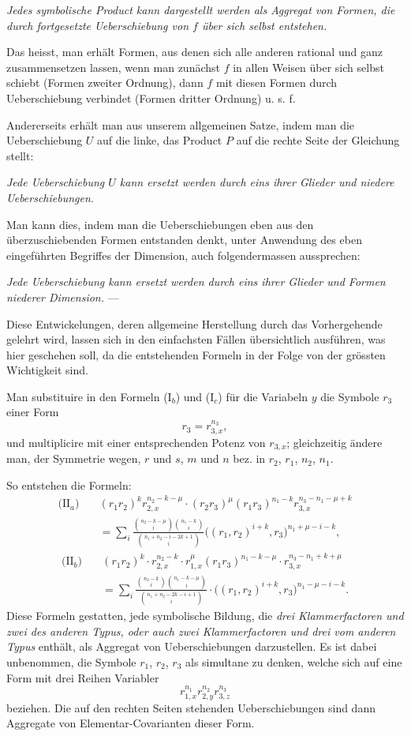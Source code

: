 \documentclass[10pt]{article}
\begin{document}
\emph{Jedes symbolische Product kann dargestellt werden als Aggregat von Formen, die durch fortgesetzte Ueberschiebung von $f$ über sich selbst entstehen.}

Das heisst, man erhält Formen, aus denen sich alle anderen rational und ganz zusammensetzen lassen, wenn man zunächst $f$ in allen Weisen über sich selbst schiebt (Formen zweiter Ordnung), dann $f$ mit diesen Formen durch Ueberschiebung verbindet (Formen dritter Ordnung) u. s. f.

Andererseits erhält man aus unserem allgemeinen Satze, indem man die Ueberschiebung $U$ auf die linke, das Product $P$ auf die rechte Seite der Gleichung stellt:

\emph{Jede Ueberschiebung $U$ kann ersetzt werden durch eins ihrer Glieder und niedere Ueberschiebungen.}

Man kann dies, indem man die Ueberschiebungen eben aus den überzuschiebenden Formen entstanden denkt, unter Anwendung des eben eingeführten Begriffes der Dimension, auch folgendermassen aussprechen:

\emph{Jede Ueberschiebung kann ersetzt werden durch eins ihrer Glieder und Formen niederer Dimension.} ---

Diese Entwickelungen, deren allgemeine Herstellung durch das Vorhergehende gelehrt wird, lassen sich in den einfachsten Fällen übersichtlich ausführen, was hier geschehen soll, da die entstehenden Formeln in der Folge von der grössten Wichtigkeit sind.

Man substituire in den Formeln (I$_b$) und (I$_c$) für die Variabeln $y$ die Symbole $r_3$ einer Form
\[
r_3=r_{3,x}^{n_3},
\]
und multiplicire mit einer entsprechenden Potenz von $r_{3,x}$; gleichzeitig ändere man, der Symmetrie wegen, $r$ und $s$, $m$ und $n$ bez. in $r_2$, $r_1$, $n_2$, $n_1$.

So entstehen die Formeln:
\[
\begin{aligned}
\text{(II$_a$)}\quad &(r_1r_2)^k r_{2,x}^{n_2-k-\mu}\cdot(r_2r_3)^\mu(r_1r_3)^{n_1-k}r_{3,x}^{n_3-n_1-\mu+k}\\
&=\sum_i\frac{\binom{n_2-k-\mu}{i}\binom{n_1-k}{i}}{\binom{n_1+n_2-i-2k+1}{i}}\bigl((r_1,r_2)^{i+k},r_3\bigr)^{n_1+\mu-i-k},
\end{aligned}
\]
\[
\begin{aligned}
\text{(II$_b$)}\quad &(r_1r_2)^k\cdot r_{2,x}^{n_2-k}\cdot r_{1,x}^{\mu}(r_1r_3)^{n_1-k-\mu}\cdot r_{3,x}^{n_3-n_1+k+\mu}\\
&=\sum_i\frac{\binom{n_2-k}{i}\binom{n_1-k-\mu}{i}}{\binom{n_1+n_2-2k-i+1}{i}}\cdot\bigl((r_1,r_2)^{i+k},r_3\bigr)^{n_1-\mu-i-k}.
\end{aligned}
\]
Diese Formeln gestatten, jede symbolische Bildung, die \emph{drei Klammerfactoren und zwei des anderen Typus, oder auch zwei Klammerfactoren und drei vom anderen Typus} enthält, als Aggregat von Ueberschiebungen darzustellen. Es ist dabei unbenommen, die Symbole $r_1$, $r_2$, $r_3$ als simultane zu denken, welche sich auf eine Form mit drei Reihen Variabler
\[
r_{1,x}^{n_1}r_{2,y}^{n_2}r_{3,z}^{n_3}
\]
beziehen. Die auf den rechten Seiten stehenden Ueberschiebungen sind dann Aggregate von Elementar-Covarianten dieser Form.
\end{document}
